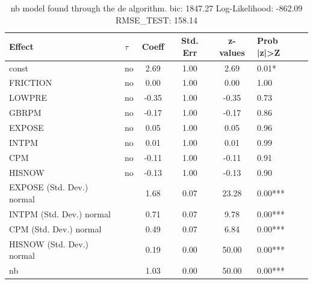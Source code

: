 \begin{table}
	\caption{nb model found through the de algorithm. bic: 1847.27 Log-Likelihood: -862.09 RMSE_TEST: 158.14}
	\begin{center}
		\begin{tabular}{|l|l|c|c|c|l|}
			\hline
			Effect & $\tau$ & Coeff & Std. Err & z-values & Prob |z|>Z \\
			\hline
			const & no & 2.69 & 1.00 & 2.69 & 0.01* \\
			\hline
			FRICTION & no & 0.00 & 1.00 & 0.00 & 1.00 \\
			\hline
			LOWPRE & no & -0.35 & 1.00 & -0.35 & 0.73 \\
			\hline
			GBRPM & no & -0.17 & 1.00 & -0.17 & 0.86 \\
			\hline
			EXPOSE & no & 0.05 & 1.00 & 0.05 & 0.96 \\
			\hline
			INTPM & no & 0.01 & 1.00 & 0.01 & 0.99 \\
			\hline
			CPM & no & -0.11 & 1.00 & -0.11 & 0.91 \\
			\hline
			HISNOW & no & -0.13 & 1.00 & -0.13 & 0.90 \\
			\hline
			EXPOSE (Std. Dev.) normal &  & 1.68 & 0.07 & 23.28 & 0.00*** \\
			\hline
			INTPM (Std. Dev.) normal &  & 0.71 & 0.07 & 9.78 & 0.00*** \\
			\hline
			CPM (Std. Dev.) normal &  & 0.49 & 0.07 & 6.84 & 0.00*** \\
			\hline
			HISNOW (Std. Dev.) normal &  & 0.19 & 0.00 & 50.00 & 0.00*** \\
			\hline
			nb &  & 1.03 & 0.00 & 50.00 & 0.00*** \\
			\hline
		\end{tabular}
	\end{center}
\end{table}